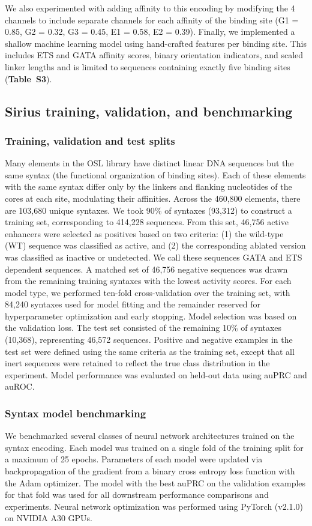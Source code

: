We also experimented with adding affinity to this encoding by modifying the 4 channels to include separate channels for each affinity of the binding site (G1 = 0.85, G2 = 0.32, G3 = 0.45, E1 = 0.58, E2 = 0.39). Finally, we implemented a shallow machine learning model using hand-crafted features per binding site. This includes ETS and GATA affinity scores, binary orientation indicators, and scaled linker lengths and is limited to sequences containing exactly five binding sites (\textbf{Table~S3}).

\subsection{Sirius training, validation, and benchmarking}

\subsubsection{Training, validation and test splits}
Many elements in the OSL library have distinct linear DNA sequences but the same syntax (the functional organization of binding sites). Each of these elements with the same syntax differ only by the linkers and flanking nucleotides of the cores at each site, modulating their affinities. Across the 460,800 elements, there are 103,680 unique syntaxes. We took 90\% of syntaxes (93,312) to construct a training set, corresponding to 414,228 sequences. From this set, 46,756 active enhancers were selected as positives based on two criteria: (1) the wild-type (WT) sequence was classified as active, and (2) the corresponding ablated version was classified as inactive or undetected. We call these sequences GATA and ETS dependent sequences. A matched set of 46,756 negative sequences was drawn from the remaining training syntaxes with the lowest activity scores. For each model type, we performed ten-fold cross-validation over the training set, with 84,240 syntaxes used for model fitting and the remainder reserved for hyperparameter optimization and early stopping. Model selection was based on the validation loss. The test set consisted of the remaining 10\% of syntaxes (10,368), representing 46,572 sequences. Positive and negative examples in the test set were defined using the same criteria as the training set, except that all inert sequences were retained to reflect the true class distribution in the experiment. Model performance was evaluated on held-out data using auPRC and auROC.

\subsubsection{Syntax model benchmarking}
We benchmarked several classes of neural network architectures trained on the syntax encoding. Each model was trained on a single fold of the training split for a maximum of 25 epochs. Parameters of each model were updated via backpropagation of the gradient from a binary cross entropy loss function with the Adam optimizer\cite{Kingma2014-kn}. The model with the best auPRC on the validation examples for that fold was used for all downstream performance comparisons and experiments. Neural network optimization was performed using PyTorch (v2.1.0) on NVIDIA A30 GPUs.

